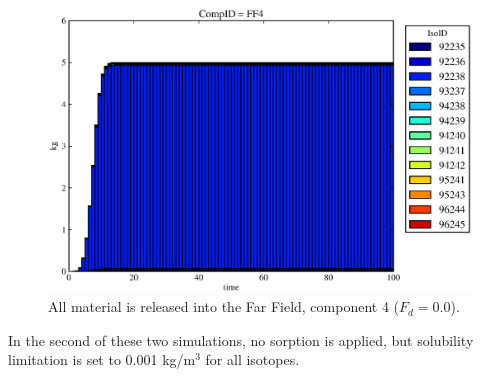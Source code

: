 \begin{figure}[ht]
\begin{minipage}[b]{0.45\linewidth}
  \includegraphics[width=\textwidth]{./chapters/demonstration/base/mcI0.eps}
  \caption[Case MCI Waste Package Contaminants.]{All material is released into the Far Field, component 4 ($F_d=0.0$).}
  \label{fig:mcIff0}


  \end{minipage}
\end{figure}
\FloatBarrier

In the second of these two simulations, no sorption is applied, but solubility 
limitation is set to 0.001 kg/m$^3$ for all isotopes. 

